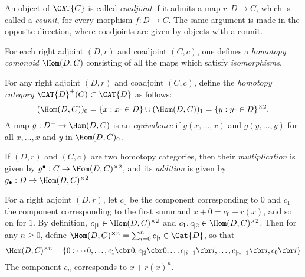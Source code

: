 \documentclass[a4paper,reqno,oneside]{article}
\begin{document}
\begin{definition}
An object of $\CAT{C}$ is called \emph{coadjoint} if it admits a map $r: D \rightarrow C$,
which is called a \emph{counit}, for every morphism $f: D \rightarrow C$.  The same
argument is made in the opposite direction, where coadjoints are given
by objects with a counit.
\end{definition}

For each right adjoint $(D,r)$ and coadjoint $(C,c)$, one defines a \emph{homotopy 
comonoid} $\Hom(D,C)$ consisting of all the maps which satisfy
\emph{isomorphisms}. 

\begin{definition}\label{defn.htpcats}
For any right adjoint $(D,r)$ and coadjoint $(C,c)$, define the \emph{homotopy 
category} $\CAT{D}^{+}(C) \subset \CAT{D}$ as follows:
\[
(\Hom(D,C))_0 = \{x : x\text{-}\in D\} \cup (\Hom(D,C))_1 = 
\{y : y \text{-}\in D\}^{\times 2}.
\]
A map $g : D^{+} \rightarrow \Hom(D,C)$ is an \emph{equivalence} if $g(x,\dots,x)$
and $g(y,\dots,y)$ for all $x,\dots,x$ and $y$ in $\Hom(D,C)_0$.
\end{definition}

\begin{remark}
If $(D,r)$ and $(C,c)$ are two homotopy categories, then their \emph{multiplication} 
is given by $g^{\bullet}: C \rightarrow \Hom(D,C)^{\times 2}$, and its \emph{addition} 
is given by $g_{\bullet}: D \rightarrow \Hom(D,C)^{\times 2}$.
\end{remark}

For a right adjoint $(D,r)$, let $c_0$ be the component corresponding to $0$ and
$c_1$ the component corresponding to the first summand $x + 0 = c_0 + r(x)$,
and so on for $1$. By definition, $c_{|1} \in \Hom(D,C)^{\times 2}$ and
$c_1,c_{|2} \in \Hom(D,C)^{\times 2}$. Then for any $n \geq 0$, define 
$\Hom(D,C)^{\times n} = \sum_{i=0}^n c_{|i} \in \Cat{D}$, so that
$$
\Hom(D,C)^{\times n} = \{0:\cdots 0,\ldots, c_1\cbr 0, c_{|2} 
\cbr 0,\ldots c_{|i-1}\cbr i,\ldots, c_{|n-1}\cbr i, c_0\cbr i \}
$$
The component $c_n$ corresponds to $x + r(x)^n$.
\end{document}
